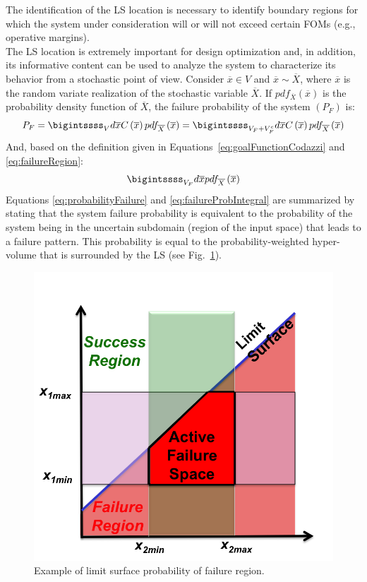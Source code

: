The identification of the LS location is necessary to identify boundary regions for which the system under consideration will or will not exceed certain FOMs (e.g., operative margins).
\\The LS location is extremely important for design optimization and, in addition, its informative content can be used to analyze the system to characterize its behavior from a stochastic point of view. Consider $\overline{x} \in V$ and $\overline{x}\sim \overline{X}$,
where $\overline{x}$ is the random variate realization of the stochastic variable $\overline{X}$.
If $pdf_{\overline{X}}\left ( \overline{x} \right ) $ is the probability density function of $ \overline{X}$, the failure probability of the system $\left ( P_{F} \right )$ is:
\begin{equation}
\label{eq:probabilityFailure}
P_{F} = \bigintssss_{V}d\overline{x}C\left ( \overline{x} \right )pdf_{\overline{X}}\left ( \overline{x} \right ) = \bigintssss_{V_{F}+V_{F}^{c}}d\overline{x}C\left ( \overline{x} \right )pdf_{\overline{X}}\left ( \overline{x} \right )
\end{equation}
And, based on the definition given in Equations~\ref{eq:goalFunctionCodazzi} and \ref{eq:failureRegion}:
\begin{equation}
 \label{eq:failureProbIntegral}
 \bigintssss_{V_{F}}d\overline{x}pdf_{\overline{X}}\left ( \overline{x} \right ) 
 \end{equation}
Equations \ref{eq:probabilityFailure} and \ref{eq:failureProbIntegral} are summarized by stating that the system failure probability is 
equivalent to the probability of the system being in the uncertain 
subdomain (region of the input space) that leads to a failure pattern. 
This probability is equal to the probability-weighted hyper-volume that is surrounded by the LS (see Fig.~\ref{fig:ProbabilityFailureLSExample}).
\begin{figure}[h!]
  \centering
  \includegraphics[width=1.0\textwidth]  {pics/ProbabilityFailureLSExample.png}
  \caption{Example of limit surface probability of failure region.}
  \label{fig:ProbabilityFailureLSExample}
\end{figure}
